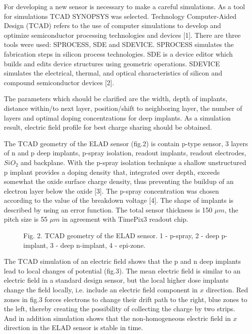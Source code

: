 For developing a new sensor is necessary to make a careful simulations. As a tool for simulations TCAD SYNOPSYS was selected. Technology Computer-Aided Design (TCAD) refers to the use of computer simulations to develop and optimize semiconductor processing technologies and devices [1]. There are three tools were used: SPROCESS, SDE and SDEVICE. SPROCESS simulates the fabrication steps in silicon process technologies. SDE is a device editor which builds and edits device structures using geometric operations. SDEVICE simulates the electrical, thermal, and optical characteristics of silicon and compound semiconductor devices [2].

The parameters which should be clarified are the width, depth of implants, distance within/to next layer, position/shift to neighboring layer, the number of layers and optimal doping concentrations for deep implants. As a simulation result, electric field profile for best charge sharing should be obtained. 

The TCAD geometry of the ELAD sensor (fig.2) is contain p-type sensor, 3 layers of n and p deep implants, p-spray isolation, readout implants, readout electrodes, $SiO_2$ and backplane. With the p-spray isolation technique a shallow unstructured p implant provides a doping density that, integrated over depth, exceeds somewhat the oxide surface charge density, thus preventing the buildup of an electron layer below the oxide [3]. The p-spray concentration was chosen according to the value of the breakdown voltage [4]. The shape of implants is described by using an error function. The total sensor thickness is 150 $\mu m$, the pitch size is 55 $\mu m$ in agreement with TimePix3 readout chip. 

\begin{figure}[h]

Fig. 2. TCAD geometry of the ELAD sensor. 1 - p-spray, 2 - deep p-implant, 3 - deep n-implant, 4 - epi-zone. 
\end{figure}

The TCAD simulation of an electric field shows that the p and n deep implants lead to local changes of potential (fig.3). The mean electric field is similar to an electric field in a standard design sensor, but the local higher dose implants change the field locally, i.e. include an electric field component in $x$ direction. Red zones in fig.3 forces electrons to change their drift path to the right, blue zones to the left, thereby creating the possibility of collecting the charge by two strips. And in addition simulation shows that the non-homogeneous electric field in $x$ direction in the ELAD sensor is stable in time. 

